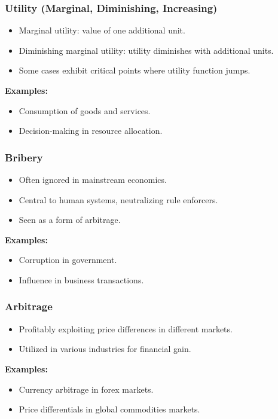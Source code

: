 \begin{frame}[fragile]\frametitle{Utility (Marginal, Diminishing, Increasing)}
\begin{itemize}
    \item Marginal utility: value of one additional unit.
    \item Diminishing marginal utility: utility diminishes with additional units.
    \item Some cases exhibit critical points where utility function jumps.
\end{itemize}
\textbf{Examples:}
\begin{itemize}
    \item Consumption of goods and services.
    \item Decision-making in resource allocation.
\end{itemize}
\end{frame}

\begin{frame}[fragile]\frametitle{Bribery}
\begin{itemize}
    \item Often ignored in mainstream economics.
    \item Central to human systems, neutralizing rule enforcers.
    \item Seen as a form of arbitrage.
\end{itemize}
\textbf{Examples:}
\begin{itemize}
    \item Corruption in government.
    \item Influence in business transactions.
\end{itemize}
\end{frame}

\begin{frame}[fragile]\frametitle{Arbitrage}
\begin{itemize}
    \item Profitably exploiting price differences in different markets.
    \item Utilized in various industries for financial gain.
\end{itemize}
\textbf{Examples:}
\begin{itemize}
    \item Currency arbitrage in forex markets.
    \item Price differentials in global commodities markets.
\end{itemize}
\end{frame}

